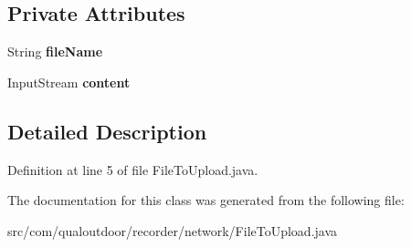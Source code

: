 \subsection*{Private Attributes}
\begin{DoxyCompactItemize}
\item 
\hypertarget{classcom_1_1qualoutdoor_1_1recorder_1_1network_1_1FileToUpload_acf965342e748e1d80c1fe84033efeb8a}{String {\bfseries file\-Name}}\label{classcom_1_1qualoutdoor_1_1recorder_1_1network_1_1FileToUpload_acf965342e748e1d80c1fe84033efeb8a}

\item 
\hypertarget{classcom_1_1qualoutdoor_1_1recorder_1_1network_1_1FileToUpload_a0c16a47c8e2db1f26b41b2c8a4269e27}{Input\-Stream {\bfseries content}}\label{classcom_1_1qualoutdoor_1_1recorder_1_1network_1_1FileToUpload_a0c16a47c8e2db1f26b41b2c8a4269e27}

\end{DoxyCompactItemize}


\subsection{Detailed Description}


Definition at line 5 of file File\-To\-Upload.\-java.



The documentation for this class was generated from the following file\-:\begin{DoxyCompactItemize}
\item 
src/com/qualoutdoor/recorder/network/File\-To\-Upload.\-java\end{DoxyCompactItemize}
